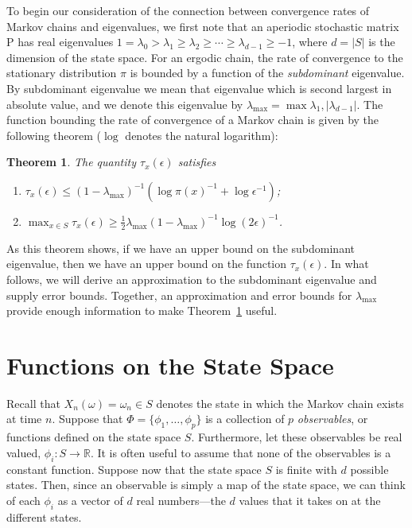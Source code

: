 \documentclass[12pt,letterpaper]{report}
\theoremstyle{plain}
\newtheorem{theorem}{Theorem}[chapter]
\theoremstyle{definition}
\theoremstyle{remark}
\numberwithin{theorem}{chapter}
\numberwithin{claim}{chapter}
\numberwithin{equation}{chapter}
\numberwithin{conjecture}{chapter}
\newcommand\R{\ensuremath{\mathbb{R}}}
\renewcommand\P{\ensuremath{\mathrm{P}}}
\newcommand\<{\ensuremath{\langle}}
\renewcommand\>{\ensuremath{\rangle}}
\begin{document}
To begin our consideration of the connection between convergence rates of Markov
chains and eigenvalues, we first note that an aperiodic stochastic matrix $\P$ has real
eigenvalues 
$1 = \lambda_0 > \lambda_1 \geq \lambda_2 \geq \cdots \geq \lambda_{d-1} \geq -1$, 
where $d = |S|$ is the dimension of the state space. For an ergodic chain, the
rate of convergence to the stationary distribution $\pi$ is bounded by a
function of the \emph{subdominant} eigenvalue. By subdominant eigenvalue we mean that
eigenvalue which is second largest in absolute value, and we denote this
eigenvalue by $\lambda_{\max} = \max{\lambda_1, |\lambda_{d-1}|}$. 
The function bounding the rate of convergence of a Markov chain is given by the
following theorem ($\log$ denotes the natural logarithm):
\begin{theorem}
\label{thm-2.1.2}
The quantity $\tau_x(\epsilon)$ satisfies
\begin{enumerate}
\item 
$\tau_x(\epsilon) \leq (1-\lambda_{\max})^{-1}(\log \pi(x)^{-1} + \log \epsilon^{-1})$;
\item $\max_{x \in S} \tau_x(\epsilon) \geq \frac{1}{2} \lambda_{\max}(1-\lambda_{\max})^{-1} \log(2\epsilon)^{-1}$.
\end{enumerate}
\end{theorem}
As this theorem shows, if we have an upper bound on the subdominant eigenvalue, then we have
an upper bound on the function $\tau_x(\epsilon)$. In what follows, we will
derive an approximation to the 
subdominant eigenvalue and supply error bounds. Together, an approximation and error bounds
for $\lambda_{\max}$  provide enough information to make Theorem~\ref{thm-2.1.2} useful.

\section{Functions on the State Space}
\label{sec:funct-state-space}
Recall that $X_n(\omega) = \omega_n\in S$ denotes the state in which the Markov
chain exists at time $n$. 
Suppose that 
$\Phi = \{\phi_1, \dots, \phi_p\}$ 
is a collection of $p$ \emph{observables}, or functions defined on the state
space $S$. Furthermore, let these observables be real valued, 
$\phi_i : S \rightarrow \R$. 
It is often useful to assume that none of the observables is a constant function. Suppose now that
the state space $S$ is finite with $d$ possible states. Then, since an
observable is simply a map of the state space, we can think of each $\phi_i$ as a
vector of $d$ real numbers---the $d$ values that it takes on at the different states.
\end{document}
